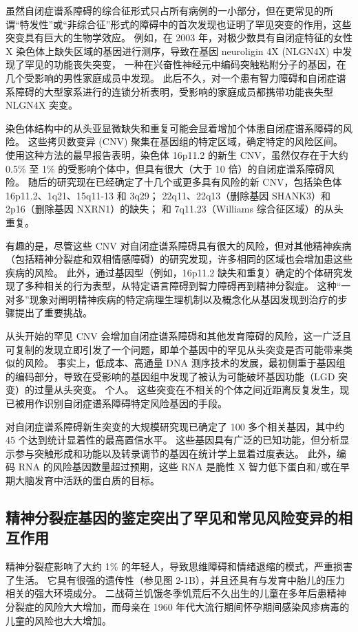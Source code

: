 虽然自闭症谱系障碍的综合征形式只占所有病例的一小部分，但在更常见的所谓“特发性”或“非综合征”形式的障碍中的首次发现也证明了罕见突变的作用，这些突变具有巨大的生物学效应。 例如，在 2003 年，对极少数具有自闭症特征的女性 X 染色体上缺失区域的基因进行测序，导致在基因 neuroligin 4X (NLGN4X) 中发现了罕见的功能丧失突变， 一种在兴奋性神经元中编码突触粘附分子的基因，在几个受影响的男性家庭成员中发现。 此后不久，对一个患有智力障碍和自闭症谱系障碍的大型家系进行的连锁分析表明，受影响的家庭成员都携带功能丧失型 NLGN4X 突变。

染色体结构中的从头亚显微缺失和重复可能会显着增加个体患自闭症谱系障碍的风险。 这些拷贝数变异 (CNV) 聚集在基因组的特定区域，确定特定的风险区间。 使用这种方法的最早报告表明，染色体 16p11.2 的新生 CNV，虽然仅存在于大约 0.5\% 至 1\% 的受影响个体中，但具有很大（大于 10 倍）的自闭症谱系障碍风险。 随后的研究现在已经确定了十几个或更多具有风险的新 CNV，包括染色体 16p11.2、1q21、15q11-13 和 3q29； 22q11、22q13（删除基因 SHANK3）和 2p16（删除基因 NXRN1）的缺失； 和 7q11.23（Williams 综合征区域）的从头重复。

有趣的是，尽管这些 CNV 对自闭症谱系障碍具有很大的风险，但对其他精神疾病（包括精神分裂症和双相情感障碍）的研究发现，许多相同的区域也会增加患这些疾病的风险。 此外，通过基因型（例如，16p11.2 缺失和重复）确定的个体研究发现了多种相关的行为表型，从特定语言障碍到智力障碍再到精神分裂症。 这种“一对多”现象对阐明精神疾病的特定病理生理机制以及概念化从基因发现到治疗的步骤提出了重要挑战。

从头开始的罕见 CNV 会增加自闭症谱系障碍和其他发育障碍的风险，这一广泛且可复制的发现立即引发了一个问题，即单个基因中的罕见从头突变是否可能带来类似的风险。 事实上，低成本、高通量 DNA 测序技术的发展，最初侧重于基因组的编码部分，导致在受影响的基因组中发现了被认为可能破坏基因功能（LGD 突变）的过量从头突变。 个人。 这些突变在不相关的个体之间近距离反复发生，现已被用作识别自闭症谱系障碍特定风险基因的手段。

对自闭症谱系障碍新生突变的大规模研究现已确定了 100 多个相关基因，其中约 45 个达到统计显着性的最高置信水平。 这些基因具有广泛的已知功能，但分析显示参与突触形成和功能以及转录调节的基因在统计学上显着过度表达。 此外，编码 RNA 的风险基因数量超过预期，这些 RNA 是脆性 X 智力低下蛋白和/或在早期大脑发育中活跃的蛋白质的目标。


\subsection{精神分裂症基因的鉴定突出了罕见和常见风险变异的相互作用}

精神分裂症影响了大约 1\% 的年轻人，导致思维障碍和情绪退缩的模式，严重损害了生活。 它具有很强的遗传性（参见图 2-1B），并且还具有与发育中胎儿的压力相关的强大环境成分。 二战荷兰饥饿冬季饥荒后不久出生的儿童在多年后患精神分裂症的风险大大增加，而母亲在 1960 年代大流行期间怀孕期间感染风疹病毒的儿童的风险也大大增加。

